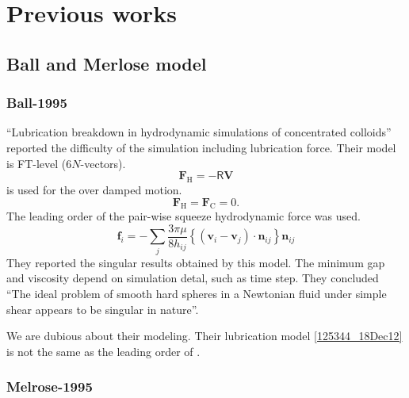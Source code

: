 \documentclass[12pt]{article}
\newcommand{\tens}[1]{\bm{\mathsf{#1}}}
\begin{document}
\section{Previous works}
\subsection*{Ball and Merlose model}

\subsubsection*{Ball-1995}

\citet{Ball_1995} ``Lubrication breakdown in hydrodynamic simulations of concentrated colloids''
reported the difficulty of the simulation including lubrication force.
Their model is FT-level ($6N$-vectors).
\begin{equation}
 \bm{F}_{\mathrm{H}} = - \tens{R} \bm{V}
\end{equation}
is used for the over damped motion.
\begin{equation}
 \bm{F}_{\mathrm{H}} = \bm{F}_{\mathrm{C}} = 0.
\end{equation}
%
The leading order of the pair-wise squeeze hydrodynamic force
was used.
\begin{equation}
 \bm{f}_i = 
- \sum_j \frac{3 \pi \mu}{8 h_{ij}} 
\left\{
(\bm{v}_i - \bm{v}_j)\cdot \bm{n}_{ij}
\right\} \bm{n}_{ij}\label{125344_18Dec12}
\end{equation}
%
They reported the singular results obtained by this model.
%
The minimum gap and viscosity 
depend on simulation detal, such as time step.
%
They concluded
``The ideal problem of smooth hard spheres
in a Newtonian fluid under simple shear appears
to be singular in nature''.
%


We are dubious about their modeling.
%
Their lubrication model \eqref{125344_18Dec12}
is not the same as the leading order of \citet{Jeffrey_1992}.



%

\subsubsection*{Melrose-1995}
\end{document}

